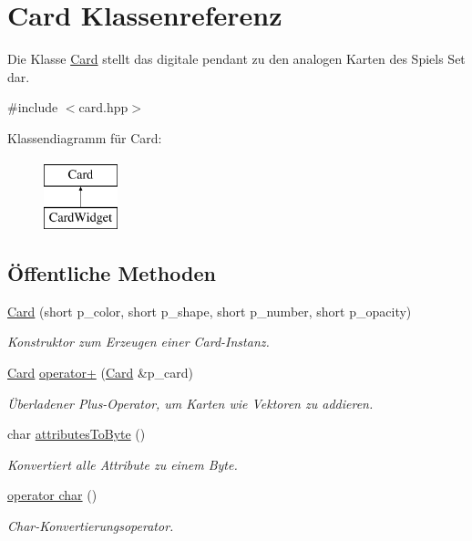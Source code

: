 \hypertarget{class_card}{}\section{Card Klassenreferenz}
\label{class_card}


Die Klasse \hyperlink{class_card}{Card} stellt das digitale pendant zu den analogen Karten des Spiels Set dar.  




{\ttfamily \#include $<$card.\+hpp$>$}

Klassendiagramm für Card\+:\begin{figure}[H]
\begin{center}
\leavevmode
\includegraphics[height=2.000000cm]{class_card}
\end{center}
\end{figure}
\subsection*{Öffentliche Methoden}
\begin{DoxyCompactItemize}
\item 
\hyperlink{class_card_ae26b7b28f4f50dab929144c6cb5cb20a}{Card} (short p\+\_\+color, short p\+\_\+shape, short p\+\_\+number, short p\+\_\+opacity)
\begin{DoxyCompactList}\small\item\em Konstruktor zum Erzeugen einer Card-\/\+Instanz. \end{DoxyCompactList}\item 
\hyperlink{class_card}{Card} \hyperlink{class_card_a4fb042401330d63b6f6695076da4f78f}{operator+} (\hyperlink{class_card}{Card} \&p\+\_\+card)
\begin{DoxyCompactList}\small\item\em Überladener Plus-\/\+Operator, um Karten wie Vektoren zu addieren. \end{DoxyCompactList}\item 
char \hyperlink{class_card_a286395d265732984d23b851b905abb4f}{attributes\+To\+Byte} ()
\begin{DoxyCompactList}\small\item\em Konvertiert alle Attribute zu einem Byte. \end{DoxyCompactList}\item 
\hyperlink{class_card_a097725860cee499e9b99a5d8bb8d4562}{operator char} ()
\begin{DoxyCompactList}\small\item\em Char-\/\+Konvertierungsoperator. \end{DoxyCompactList}\end{DoxyCompactItemize}
